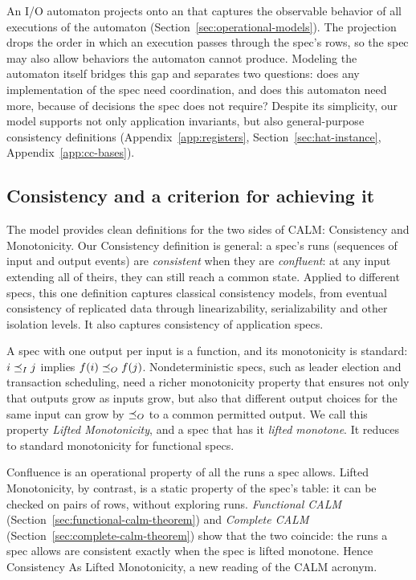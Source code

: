 An I/O automaton projects onto an \spectype[] that captures the observable
behavior of all executions of the automaton
(Section~\ref{sec:operational-models}).  The projection drops the order in
which an execution passes through the spec's rows, so the spec may also allow
behaviors the automaton cannot produce.  Modeling the automaton itself bridges
this gap and separates two questions: does any implementation of the spec need
coordination, and does this automaton need more, because of decisions the spec
does not require?
Despite its simplicity, our model supports not only application invariants,
but also general-purpose consistency definitions (Appendix~\ref{app:registers},
Section~\ref{sec:hat-instance}, Appendix~\ref{app:cc-bases}).

\subsection{Consistency and a criterion for achieving it}
The model provides clean definitions for the two sides of CALM: Consistency
and Monotonicity.  Our Consistency definition is general: a spec's runs
(sequences of input and output events) are \emph{consistent} when they are
\emph{confluent}: at any input extending all of theirs, they can still reach a
common state.  Applied to different specs,
this one definition captures classical consistency models, from eventual
consistency of replicated data through linearizability, serializability and
other isolation levels.  It also captures consistency of
application specs.

A spec with one output per input is a function, and its monotonicity is standard: $i\preceq_I j$
implies $f(i)\preceq_O f(j)$.  Nondeterministic specs, such as leader election
and transaction scheduling, need a richer monotonicity property that ensures
not only that outputs grow as inputs grow, but also that different output
choices for the same input can grow by $\preceq_O$ to a common permitted
output.  We call this property \emph{Lifted Monotonicity}, and a spec that has
it \emph{lifted monotone}.  It reduces to standard monotonicity for functional specs.

Confluence is an operational property of all the runs a spec allows.  Lifted Monotonicity,
by contrast, is a static property of the spec's table: it can be checked on
pairs of rows, without exploring runs.  \emph{Functional CALM}
(Section~\ref{sec:functional-calm-theorem}) and \emph{Complete CALM}
(Section~\ref{sec:complete-calm-theorem}) show that the two coincide: the runs a spec allows are consistent exactly when the spec is
lifted monotone.  Hence Consistency As Lifted Monotonicity, a new reading of the
CALM acronym.

